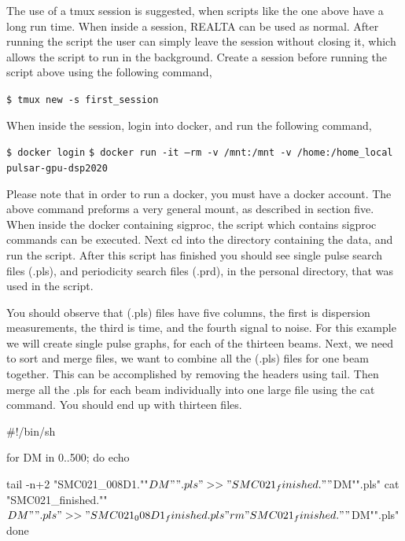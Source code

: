 \documentclass[11pt,fleqn]{book} %
\begin{document}
The use of a tmux session is suggested, when scripts like the one above have a long run time. When inside a session, REALTA can be used as normal. After running the script the user can simply leave the session without closing it, which allows the script to run in the background. Create a session before running the script above using the following command,

\vspace{3mm}

\verb|$ tmux new -s first_session|

\vspace{3mm}

When inside the session, login into docker, and run the following command,

\vspace{3mm}

\verb|$ docker login|
\bigbreak{}
\verb|$ docker run -it –rm -v /mnt:/mnt -v /home:/home_local pulsar-gpu-dsp2020|

\vspace{3mm}


Please note that in order to run a docker, you must have a docker account. The above command preforms a very general mount, as described in section five. When inside the docker containing sigproc, the script which contains sigproc commands can be executed. Next cd into the directory containing the data, and run the script. After this script has finished you should see single pulse search files (.pls), and periodicity search files (.prd), in the personal directory, that was used in the script.

 You should observe that (.pls) files have five columns, the first is dispersion measurements, the third is time, and the fourth signal to noise. For this example we will create single pulse graphs, for each of the thirteen beams. Next, we need to sort and merge files, we want to combine all the (.pls) files for one beam together.  This can be accomplished by removing the headers using tail. Then merge all the .pls for each beam individually into one large file using the cat command. You should end up with thirteen files. 

\begingroup\makeatletter{}
\verbatim
#!/bin/sh


for DM in {0..500}; do echo  

                tail -n+2 "SMC021_008D1.""$DM"".pls" >> 
                "SMC021_finished.""$DM"".pls"
                cat "SMC021_finished.""$DM"".pls"  >> 
                "SMC021_008D1_finished.pls"
                rm "SMC021_finished.""$DM"".pls"
done
\end{document}
